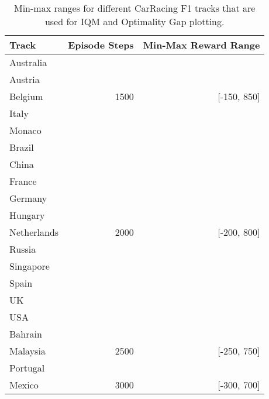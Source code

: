 \begin{table}[ht]
    \caption{Min-max ranges for different CarRacing F1 tracks that are used for IQM and Optimality Gap plotting.}
    \label{tab:car_racing_min_max}
    \centering
    \begin{tabular}{lrr}
        \toprule
        Track       & Episode Steps          & Min-Max Reward Range                     \\
        \midrule
        Australia   & \multirow{5}{*}{1500}  & \multirow{5}{*}{{[}-150, 850{]}}  \\
        Austria     &                        &                                   \\
        Belgium     &                        &                                   \\
        Italy       &                        &                                   \\
        Monaco      &                        &                                   \\
        \midrule
        Brazil      & \multirow{11}{*}{2000} & \multirow{11}{*}{{[}-200, 800{]}} \\
        China       &                        &                                   \\
        France      &                        &                                   \\
        Germany     &                        &                                   \\
        Hungary     &                        &                                   \\
        Netherlands &                        &                                   \\
        Russia      &                        &                                   \\
        Singapore   &                        &                                   \\
        Spain       &                        &                                   \\
        UK          &                        &                                   \\
        USA         &                        &                                   \\
        \midrule
        Bahrain     & \multirow{3}{*}{2500}  & \multirow{3}{*}{{[}-250, 750{]}}  \\
        Malaysia    &                        &                                   \\
        Portugal    &                        &                                   \\
        \midrule
        Mexico      & 3000                   & {[}-300, 700{]} \\
        \bottomrule
    \end{tabular}
\end{table}


